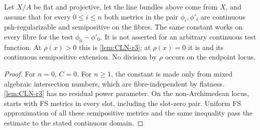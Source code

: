\medskip
\begin{corollary}
\label{cor:p171-production-family-CLN}
Let $X/A$ be flat and projective, let the line bundles above come from $X$,
and assume that for every $0\leq i\leq n$ both metrics in the pair
$\phi_i,\phi'_i$ are continuous psh-regularizable and semipositive on the
fibres.  The same constant works on every fibre for the test
$\phi_0-\phi'_0$.  It is not asserted for an arbitrary continuous test
function.  At $\rho(x)>0$ this is \cref{lem:CLN-r3}; at
$\rho(x)=0$ it is \cite[Lemma~4.10]{PS23Hybrid} and its continuous
semipositive extension.  No division by $\rho$ occurs on the endpoint
locus.
\end{corollary}

\begin{proof}
For $n=0$, $C=0$.  For $n\geq1$, the constant is made only from mixed
algebraic intersection numbers, which are fibre-independent by flatness.
\cref{lem:CLN-r3} has no residual power parameter.  On the
non-Archimedean locus, \cite[Lemma~4.10]{PS23Hybrid} starts with FS metrics in
every slot, including the slot-zero pair.  Uniform FS approximation of all
these semipositive metrics and the same inequality pass the estimate to the
stated continuous domain.
\end{proof}
